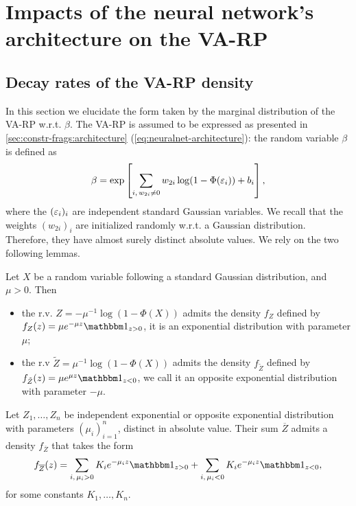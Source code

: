 \section{Impacts of the neural network's architecture on the VA-RP}\label{sec:constr-frags:app}




\subsection{Decay rates of the VA-RP density}\label{app:decay-rates}

In this section we elucidate the form taken by the marginal distribution of the VA-RP w.r.t. $\beta$.
The VA-RP is assumed to be expressed as presented in \cref{sec:constr-frags:architecture} (\cref{eq:neuralnet-architecture}): the random variable $\beta$ is defined as
    \begin{equation}\label{eq:app-expr-beta}
        \beta = \exp\left[\sum_{i,\,w_{2i}\ne0}w_{2i}\log(1-\Phi(\varepsilon_i)) + b_i\right],
    \end{equation}
where the $(\varepsilon_i)_i$ are independent standard Gaussian variables.
We recall that the weights $(w_{2i})_{i}$ are initialized randomly w.r.t. a Gaussian distribution. Therefore, they have almost surely 
distinct absolute values.
We rely on the two following lemmas.
\begin{lem}\label{lemma:expon-distrib}
    Let $X$ be a random variable following a standard Gaussian distribution, and $\mu>0$. Then
    \begin{itemize}
        \item the r.v. $Z=-\mu^{-1}\log(1-\Phi(X))$ admits the density $f_Z$ defined by $f_Z(z)=\mu e^{-\mu z}\indic_{z>0}$, it is an exponential distribution with parameter $\mu$;
        \item the r.v $\tilde Z=\mu^{-1}\log(1-\Phi(X))$ admits the density $f_{\tilde Z}$ defined by $f_{\tilde Z}(z)= \mu e^{\mu z}\indic_{z<0}$, we call it an opposite exponential distribution with parameter $-\mu$.
    \end{itemize}
\end{lem}
\begin{lem}\label{lemma:sum-of-expon}
    Let $Z_1,\dots,Z_n$ be independent exponential or opposite exponential distribution with parameters $(\mu_{i})_{i=1}^n$, distinct in absolute value. Their sum $\overline{Z}$ admits a density $f_{\overline{Z}}$ that takes the form
        \begin{equation}\label{eq:lem-pdf-Z}
            f_{\overline{Z}}(z) = \sum_{i,\,\mu_i>0}K_ie^{-\mu_i z}\indic_{z>0} + \sum_{i,\,\mu_i<0}K_ie^{-\mu_iz}\indic_{z<0},
        \end{equation}
    for some constants $K_1,\dots,K_n$.
\end{lem}


